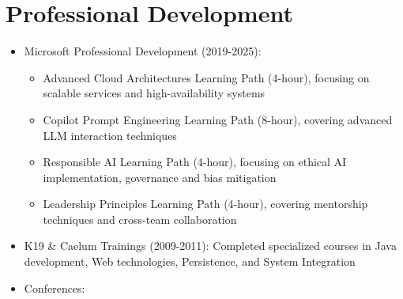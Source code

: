 
\section{Professional Development}
\begin{itemize}
    \item \small{Microsoft Professional Development (2019-2025):}
          \begin{itemize}[itemsep=1pt, parsep=0pt]
              \item \footnotesize{Advanced Cloud Architectures Learning Path (4-hour), focusing on scalable \lowercase{\BackEnd} services and high-availability systems}
              \item \footnotesize{Copilot Prompt Engineering Learning Path (8-hour), covering advanced LLM interaction techniques}
              \item \footnotesize{Responsible AI Learning Path (4-hour), focusing on ethical AI implementation, governance and bias mitigation}
              \item \footnotesize{Leadership Principles Learning Path (4-hour), covering mentorship techniques and cross-team collaboration}
          \end{itemize}
    \item \small{K19 \& Caelum Trainings (2009-2011):} \footnotesize{Completed specialized courses in Java development, Web technologies, Persistence, and System Integration}
    \item \small{Conferences:}
          \begin{itemize}[itemsep=1pt, parsep=0pt]

\end{itemize}
\end{itemize}
